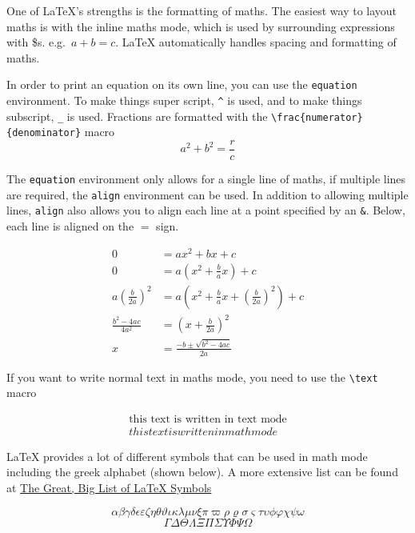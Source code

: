 \documentclass{article}
\begin{document}
One of \LaTeX{}'s strengths is the formatting of maths. The easiest way to layout maths is with the inline maths mode, which is used by surrounding expressions with \$s. e.g.\ $a + b = c$. \LaTeX{} automatically handles spacing and formatting of maths.

In order to print an equation on its own line, you can use the \lstinline{equation} environment. To make things super script, \lstinline{^} is used, and to make things subscript, \lstinline{_} is used. Fractions are formatted with the \lstinline|\frac{numerator}{denominator}| macro
\begin{equation}
    a^2 + b^2  = \frac{r}{c}
\end{equation}

The \lstinline{equation} environment only allows for a single line of maths, if multiple lines are required, the \lstinline{align} environment can be used. In addition to allowing multiple lines, \lstinline{align} also allows you to align each line at a point specified by an \lstinline{&}. Below, each line is aligned on the $=$ sign.

\begin{align}
  0 &= ax^2 + bx + c \\
  0 &= a(x^2 + \frac{b}{a}x) + c \\
  a \left( \frac{b}{2a} \right)^2 &= a \left( x^2 + \frac{b}{a}x + \left( \frac{b}{2a} \right)^2 \right) + c \\
  \frac{b^2-4ac}{4a^2} &= \left( x +\frac{b}{2a} \right)^2 \\
  x &= \frac{-b \pm \sqrt{b^2 - 4ac}}{2a}
\end{align}

If you want to write normal text in maths mode, you need to use the \lstinline{\text} macro

\begin{align}
  \text{this text is written in text mode} \\
  this text is written in math mode
\end{align}

\LaTeX{} provides a lot of different  symbols that can be  used in math mode including the greek alphabet (shown below). A more extensive list can be found at \href{https://www.rpi.edu/dept/arc/training/latex/LaTeX_symbols.pdf}{The Great, Big List of \LaTeX{} Symbols} \parencite{carlisle_great_2001}

\begin{equation}
    \alpha \beta \gamma \delta \epsilon \varepsilon \zeta \eta \theta \vartheta \iota \kappa \lambda \mu \nu \xi \pi \varpi \rho \varrho \sigma \varsigma \tau \upsilon \phi \varphi \chi \psi \omega
\end{equation}
\begin{equation}
    \Gamma \Delta \Theta \Lambda \Xi \Pi \Sigma \Upsilon \Phi \Psi \Omega
\end{equation}
\end{document}
